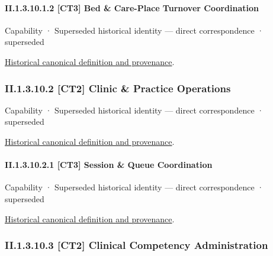 \paragraph*{II.1.3.10.1.2 [CT3] Bed \& Care-Place Turnover Coordination}
\label{navigation:II.1.3.10.1.2}

\label{element:a50662edda954bc58c44184d84591d5b}
{\small Capability · Superseded historical identity — direct correspondence · superseded}\par
\href{../../../../continuum/strategy/capability/a50662edda954bc58c44184d84591d5b.md}{Historical canonical definition and provenance}.\par
\subsubsection*{II.1.3.10.2 [CT2] Clinic \& Practice Operations}
\label{navigation:II.1.3.10.2}

\label{element:0856d2daf2ba4b92b5390b38b98efb54}
{\small Capability · Superseded historical identity — direct correspondence · superseded}\par
\href{../../../../continuum/strategy/capability/0856d2daf2ba4b92b5390b38b98efb54.md}{Historical canonical definition and provenance}.\par
\paragraph*{II.1.3.10.2.1 [CT3] Session \& Queue Coordination}
\label{navigation:II.1.3.10.2.1}

\label{element:5298c6170cef4f05a6d956da716071bd}
{\small Capability · Superseded historical identity — direct correspondence · superseded}\par
\href{../../../../continuum/strategy/capability/5298c6170cef4f05a6d956da716071bd.md}{Historical canonical definition and provenance}.\par
\subsubsection*{II.1.3.10.3 [CT2] Clinical Competency Administration}
\label{navigation:II.1.3.10.3}

